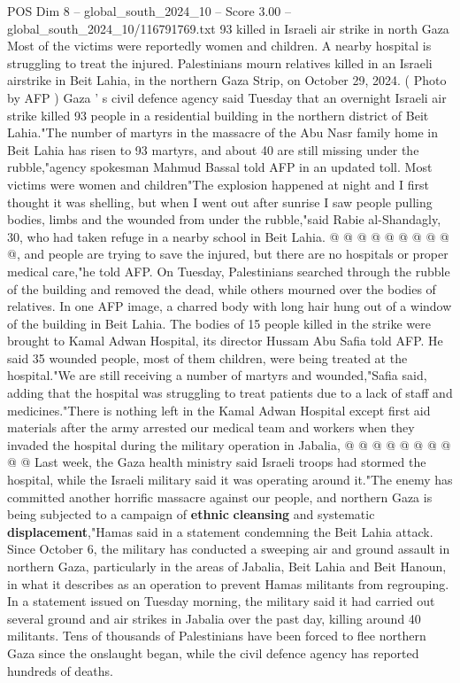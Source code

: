\begin{textsample}{POS Dim 8 – global\_south\_2024\_10 – Score 3.00 – global\_south\_2024\_10/116791769.txt}  \label{ex:f8_pos_310}
93 killed in Israeli air strike in north Gaza Most of the victims were reportedly women and children.
A nearby hospital is struggling to treat the injured.
Palestinians mourn relatives killed in an Israeli airstrike in Beit Lahia, in the northern Gaza Strip, on October 29, 2024. ( Photo by AFP ) Gaza ' s civil defence agency said Tuesday that an overnight Israeli air strike killed 93 people in a residential building in the northern district of Beit Lahia."The number of martyrs in the massacre of the Abu Nasr family home in Beit Lahia has risen to 93 martyrs, and about 40 are still missing under the rubble,"agency spokesman Mahmud Bassal told AFP in an updated toll.
Most victims were women and children"The explosion happened at night and I first thought it was shelling, but when I went out after sunrise I saw people pulling bodies, limbs and the wounded from under the rubble,"said Rabie al-Shandagly, 30, who had taken refuge in a nearby school in Beit Lahia. @ @ @ @ @ @ @ @ @ @, and people are trying to save the injured, but there are no hospitals or proper medical care,"he told AFP.
On Tuesday, Palestinians searched through the rubble of the building and removed the dead, while others mourned over the bodies of relatives.
In one AFP image, a charred body with long hair hung out of a window of the building in Beit Lahia.
The bodies of 15 people killed in the strike were brought to Kamal Adwan Hospital, its director Hussam Abu Safia told AFP.
He said 35 wounded people, most of them children, were being treated at the hospital."We are still receiving a number of martyrs and wounded,"Safia said, adding that the hospital was struggling to treat patients due to a lack of staff and medicines."There is nothing left in the Kamal Adwan Hospital except first aid materials after the army arrested our medical team and workers when they invaded the hospital during the military operation in Jabalia, @ @ @ @ @ @ @ @ @ @ Last week, the Gaza health ministry said Israeli troops had stormed the hospital, while the Israeli military said it was operating around it."The enemy has committed another horrific massacre against our people, and northern Gaza is being subjected to a campaign of \textbf{ethnic} \textbf{cleansing} and systematic \textbf{displacement},"Hamas said in a statement condemning the Beit Lahia attack.
Since October 6, the military has conducted a sweeping air and ground assault in northern Gaza, particularly in the areas of Jabalia, Beit Lahia and Beit Hanoun, in what it describes as an operation to prevent Hamas militants from regrouping.
In a statement issued on Tuesday morning, the military said it had carried out several ground and air strikes in Jabalia over the past day, killing around 40 militants.
Tens of thousands of Palestinians have been forced to flee northern Gaza since the onslaught began, while the civil defence agency has reported hundreds of deaths.

\end{textsample}
